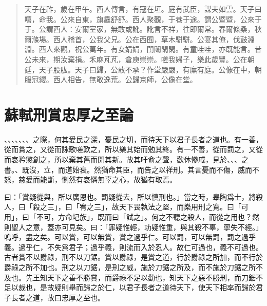 \begin{quote}
    天子在祚，歲在甲午。西人傳言，有寇在垣。庭有武臣，謀夫如雲。天子曰嘻，命我。公來自東，旗纛舒舒。西人聚觀，于巷于途。謂公暨暨，公來于于。公謂西人：安爾室家，無敢或訛。訛言不祥，往即爾常。春爾條桑，秋爾滌場。西人稽首，公我父兄。公在西囿，草木駢駢。公宴其僚，伐鼓淵淵。西人來觀，祝公萬年。有女娟娟，閨闥閑閑。有童哇哇，亦既能言。昔公未來，期汝棄捐。禾麻芃芃，倉庾崇崇。嗟我婦子，樂此歲豐。公在朝廷，天子股肱。天子曰歸，公敢不承？作堂嚴嚴，有廡有庭。公像在中，朝服冠纓。西人相告，無敢逸荒。公歸京師，公像在堂。
\end{quote}
\vspace{-1em}
\theendnotes

\section[刑賞忠厚之至論\quad{\small 蘇軾}]{{\normalsize 蘇軾}\quad 刑賞忠厚之至論}
、、、、、、、之際，何其愛民之深，憂民之切，而待天下以君子長者之道也。有一善，從而賞之，又從而詠歌嗟歎之，所以樂其始而勉其終。有一不善，從而罰之，又從而哀矜懲創之，所以棄其舊而開其新。故其吁俞之聲，歡休慘戚，見於、、、之書。、既沒，立，而道始衰。然猶命其臣，而告之以祥刑。其言憂而不傷，威而不怒，慈愛而能斷，惻然有哀憐無辜之心，故猶有取焉。

曰：「賞疑從與，所以廣恩也。罰疑從去，所以慎刑也。」當之時，皋陶爲士，將殺人，曰「殺之三」，曰「宥之三」，故天下畏執法之堅，而樂用刑之寬。曰「可用」，曰「不可，方命圮族」，既而曰「試之」。何之不聽之殺人，而從之用也？然則聖人之意，蓋亦可見矣。曰：「罪疑惟輕，功疑惟重，與其殺不辜，寧失不經。」嗚呼，盡之矣。可以賞，可以無賞，賞之過乎仁。可以罰，可以無罰，罰之過乎義。過乎仁，不失爲君子；過乎義，則流而入於忍人。故仁可過也，義不可過也。古者賞不以爵祿，刑不以刀鋸。賞以爵祿，是賞之道，行於爵祿之所加，而不行於爵祿之所不加也。刑之以刀鋸，是刑之威，施於刀鋸之所及，而不施於刀鋸之所不及也。先王知天下之善不勝賞，而爵祿不足以勸也，知天下之惡不勝刑，而刀鋸不足以裁也，是故疑則舉而歸之於仁，以君子長者之道待天下，使天下相率而歸於君子長者之道，故曰忠厚之至也。

